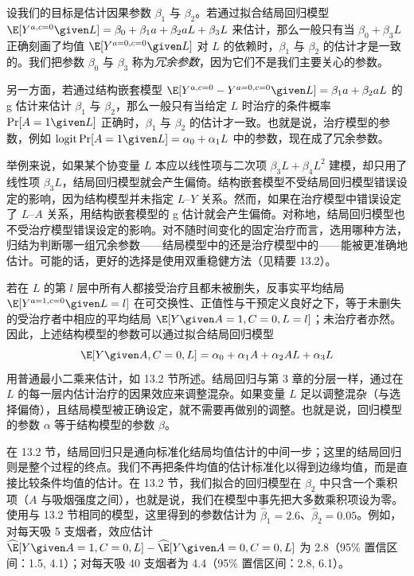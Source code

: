 \begin{finepoint}[冗余参数]
设我们的目标是估计因果参数 $\beta_1$ 与 $\beta_2$。若通过拟合结局回归模型 $\E[Y^{a,c=0}\given L]=\beta_0+\beta_1a+\beta_2aL+\beta_3L$ 来估计，那么一般只有当 $\beta_0+\beta_3L$ 正确刻画了均值 $\E[Y^{a=0,c=0}\given L]$ 对 $L$ 的依赖时，$\beta_1$ 与 $\beta_2$ 的估计才是一致的。我们把参数 $\beta_0$ 与 $\beta_3$ 称为\emph{冗余参数}，因为它们不是我们主要关心的参数。

另一方面，若通过结构嵌套模型 $\E[Y^{a,c=0}-Y^{a=0,c=0}\given L]=\beta_1a+\beta_2aL$ 的 g 估计来估计 $\beta_1$ 与 $\beta_2$，那么一般只有当给定 $L$ 时治疗的条件概率 $\Pr[A=1\given L]$ 正确时，$\beta_1$ 与 $\beta_2$ 的估计才一致。也就是说，治疗模型的参数，例如 $\operatorname{logit}\Pr[A=1\given L]=\alpha_0+\alpha_1L$ 中的参数，现在成了冗余参数。

举例来说，如果某个协变量 $L$ 本应以线性项与二次项 $\beta_3L+\beta_4L^2$ 建模，却只用了线性项 $\beta_3L$，结局回归模型就会产生偏倚。结构嵌套模型不受结局回归模型错误设定的影响，因为结构模型并未指定 $L$–$Y$ 关系。然而，如果在治疗模型中错误设定了 $L$–$A$ 关系，用结构嵌套模型的 g 估计就会产生偏倚。对称地，结局回归模型也不受治疗模型错误设定的影响。对不随时间变化的固定治疗而言，选用哪种方法，归结为判断哪一组冗余参数——结局模型中的还是治疗模型中的——能被更准确地估计。可能的话，更好的选择是使用双重稳健方法（见精要 13.2）。
\end{finepoint}

若在 $L$ 的第 $l$ 层中所有人都接受治疗且都未被删失，反事实平均结局 $\E[Y^{a=1,c=0}\given L=l]$ 在可交换性、正值性与干预定义良好之下，等于未删失的受治疗者中相应的平均结局 $\E[Y\given A=1,C=0,L=l]$；未治疗者亦然。因此，上述结构模型的参数可以通过拟合结局回归模型
\[
\E[Y\given A,C=0,L]=\alpha_0+\alpha_1A+\alpha_2AL+\alpha_3L
\]
用普通最小二乘来估计，如 13.2 节所述。结局回归与第 3 章的分层一样，通过在 $L$ 的每一层内估计治疗的因果效应来调整混杂。如果变量 $L$ 足以调整混杂（与选择偏倚），且结局模型被正确设定，就不需要再做别的调整。也就是说，回归模型的参数 $\alpha$ 等于结构模型的参数 $\beta$。

在 13.2 节，结局回归只是通向标准化结局均值估计的中间一步；这里的结局回归则是整个过程的终点。我们不再把条件均值的估计标准化以得到边缘均值，而是直接比较条件均值的估计。在 13.2 节，我们拟合的回归模型在 $\beta_2$ 中只含一个乘积项（$A$ 与吸烟强度之间），也就是说，我们在模型中事先把大多数乘积项设为零。使用与 13.2 节相同的模型，这里得到的参数估计为 $\hat\beta_1=2.6$、$\hat\beta_2=0.05$。例如，对每天吸 5 支烟者，效应估计 $\widehat{\E}[Y\given A=1,C=0,L]-\widehat{\E}[Y\given A=0,C=0,L]$ 为 2.8（95\% 置信区间：1.5, 4.1）；对每天吸 40 支烟者为 4.4（95\% 置信区间：2.8, 6.1）。

